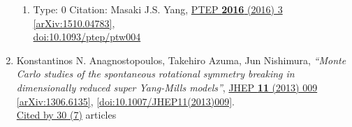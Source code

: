 \documentclass[a4paper,10pt]{article}
\begin{document}
\begin{enumerate}
\begin{enumerate}
  \item Type: 0 Citation: Masaki J.S. Yang, \href{https://www.doi.org/10.1093/ptep/ptw004}{PTEP {\bf 2016} (2016) 3}  \href{https://arxiv.org/abs/1510.04783}{[arXiv:1510.04783]},\\\href{https://www.doi.org/10.1093/ptep/ptw004}{doi:10.1093/ptep/ptw004}
\end{enumerate}
\item Konstantinos N. Anagnostopoulos, Takehiro Azuma, Jun Nishimura, {\it ``Monte Carlo studies of the spontaneous rotational symmetry breaking in dimensionally reduced super Yang-Mills models''}, \href{https://www.doi.org/10.1007/JHEP11(2013)009}{JHEP {\bf 11} (2013) 009} \href{https://arxiv.org/abs/1306.6135}{[arXiv:1306.6135]}, \href{https://www.doi.org/10.1007/JHEP11(2013)009}{[doi:10.1007/JHEP11(2013)009]}.
\\\href{https://inspirehep.net/literature/?q=refersto%3Arecid%3A1239963}{Cited by 30 (7)} articles


\end{enumerate}
\end{document}
